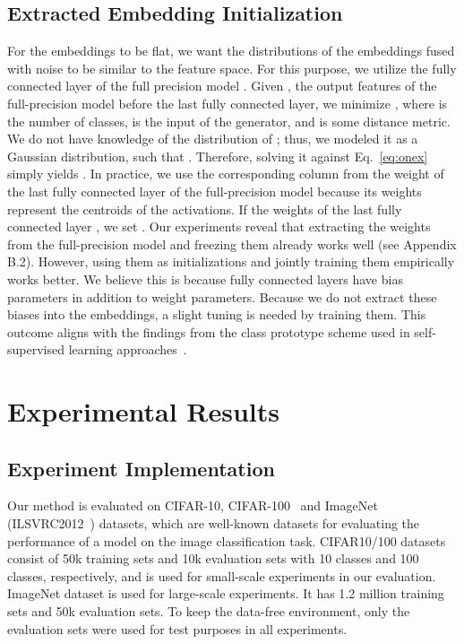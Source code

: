 \documentclass{article}
\newcommand{\rev}[1]{{\color{olivegreen}#1}}
\renewcommand{\rev}[1]{#1}
\begin{document}
\subsection{Extracted Embedding Initialization}
For the embeddings to be flat, we want the distributions of the embeddings fused with noise to be similar to the feature space.
For this purpose, we utilize the fully connected layer of the full precision model .
Given , the output features of the full-precision model before the last fully connected layer, we minimize 
    ,
where  is the number of classes,  is the input of the generator, and  is some distance metric.
We do not have knowledge of the distribution of ; thus, we modeled it as a Gaussian distribution, such that .
Therefore, solving it against Eq.~\ref{eq:onex} simply yields .
In practice, we use the corresponding column from the weight of the last fully connected layer of the full-precision model because its weights represent the centroids of the activations. 
If the weights of the last fully connected layer , we set .
Our experiments reveal that extracting the weights from the full-precision model and freezing them already works well \rev{(see Appendix B.2)}. 
However, using them as initializations and jointly training them empirically works better. 
We believe this is because fully connected layers have bias parameters in addition to weight parameters.
Because we do not extract these biases into the embeddings, a slight tuning is needed by training them.  
This outcome aligns with the findings from the class prototype scheme used in self-supervised learning approaches~\cite{saito2019semi, saito2020universal}.



\section{Experimental Results}
\label{sec:exp}

\subsection{Experiment Implementation}
Our method is evaluated on CIFAR-10, CIFAR-100~\cite{cifar} and ImageNet (ILSVRC2012~\cite{imagenet}) datasets, which are well-known datasets for evaluating the performance of a model on the image classification task. 
CIFAR10/100 datasets consist of 50k training sets and 10k evaluation sets with 10 classes and 100 classes, respectively, and is used for small-scale experiments in our evaluation.
ImageNet dataset is used for large-scale experiments. 
It has 1.2 million training sets and 50k evaluation sets. 
To keep the data-free environment, only the evaluation sets were used for test purposes in all experiments. 
\end{document}
